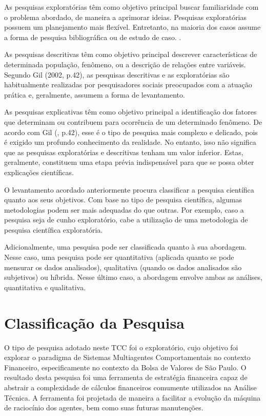 As pesquisas exploratórias têm como objetivo principal buscar familiaridade com o problema abordado, de maneira a aprimorar ideias.  Pesquisas exploratórias possuem um planejamento mais flexível. Entretanto, na maioria dos casos assume a forma de pesquisa bibliográfica ou de estudo de caso. \cite[p. 41]{gil2002}.

As pesquisas descritivas têm como objetivo principal descrever características de determinada população, fenômeno, ou a descrição de relações entre variáveis. Segundo Gil (2002, p.42), as pesquisas descritivas e as exploratórias são habitualmente realizadas por pesquisadores sociais preocupados com a atuação prática e, geralmente, assumem a forma de levantamento.

As pesquisas explicativas têm como objetivo principal a identificação dos fatores que determinam ou contribuem para ocorrência de um determinado fenômeno. De acordo com Gil (\citeyear{gil2002}, p.42), esse é o tipo de pesquisa mais complexo e delicado, pois é exigido um profundo conhecimento da realidade. No entanto, isso não significa que as pesquisas exploratórias e descritivas tenham um valor inferior. Estas, geralmente, constituem uma etapa prévia indispensável para que se possa obter explicações científicas. 

O levantamento acordado anteriormente procura classificar a pesquisa científica quanto aos seus objetivos. Com base no tipo de pesquisa científica, algumas metodologias podem ser mais adequadas do que outras. Por exemplo, caso a pesquisa seja de cunho exploratório, cabe a utilização de uma metodologia de pesquisa científica exploratória. 

Adicionalmente, uma pesquisa pode ser classificada quanto à sua abordagem. Nesse caso, uma pesquisa pode ser quantitativa (aplicada quanto se pode mensurar os dados analisados), qualitativa (quando os dados analisados são subjetivos) ou híbrida. Nesse último caso, a abordagem envolve ambas as análises, quantitativa e qualitativa.

\section{Classificação da Pesquisa }

O tipo de pesquisa adotado neste TCC foi o exploratório, cujo objetivo foi explorar o paradigma de Sistemas Multiagentes Comportamentais no contexto Financeiro, especificamente no contexto da Bolsa de Valores de São Paulo. O resultado desta pesquisa foi uma ferramenta de estratégia financeira capaz de abstrair a complexidade de cálculos financeiros comumente utilizados na Análise Técnica. A ferramenta foi projetada de maneira a facilitar a evolução da máquina de raciocínio dos agentes, bem como suas futuras manutenções. 



